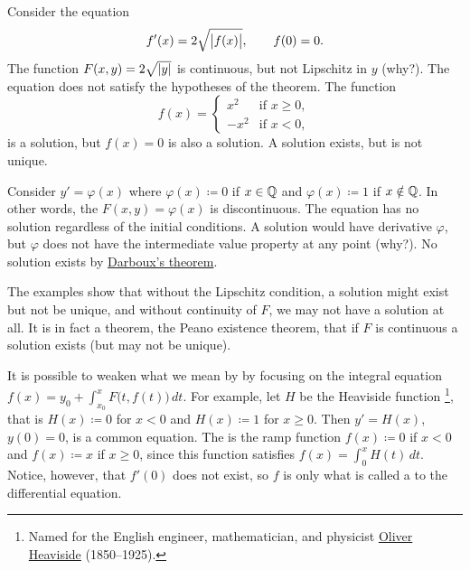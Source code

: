 \begin{example}
Consider the equation
\begin{equation*}
f'(x) = 2 \sqrt{\bigl\lvert {f(x)} \bigr\rvert}, \qquad f(0) = 0 .
\end{equation*}
The function $F(x,y) = 2 \sqrt{\lvert {y} \rvert}$ is continuous,
but not Lipschitz in $y$ (why?). 
The equation does not satisfy the hypotheses of the theorem.
The function
\begin{equation*}
f(x) =
\begin{cases}
x^2 & \text{if } x \geq 0,\\
-x^2 & \text{if } x < 0,
\end{cases}
\end{equation*}
is a solution, but $f(x) = 0$ is also a solution.
A solution exists, but is not unique.
\end{example}

\begin{example}
Consider $y' = \varphi(x)$ where $\varphi(x) \coloneqq 0$ if $x \in {\mathbb{Q}}$ and
$\varphi(x)\coloneqq 1$ if $x
\notin {\mathbb{Q}}$.  In other words, the $F(x,y) = \varphi(x)$ is discontinuous.
The equation has no solution regardless of the initial
conditions.
A solution would have
derivative $\varphi$, but $\varphi$ does not have the intermediate value property
at any point (why?).  No solution exists by
\hyperref[thm:darboux]{Darboux's theorem}.
\end{example}

The examples show that without the Lipschitz condition, a solution might
exist but not be unique, and without continuity of $F$, we may not
have a solution at all.
It is in fact a theorem, the Peano existence theorem, that if $F$ is
continuous a solution exists (but may not be unique).

\begin{remark}
It is possible to weaken what we mean by 
by focusing on the integral equation
$f(x) = y_0 + \int_{x_0}^x F\bigl(t,f(t)\bigr) \, dt$.  For example,
let $H$ be the
Heaviside function%
\footnote{Named
for the English engineer, mathematician, and physicist
\href{https://en.wikipedia.org/wiki/Oliver_Heaviside}{Oliver Heaviside}
(1850--1925).},
that is $H(x) \coloneqq 0$ for $x < 0$ and $H(x) \coloneqq 1$ for $x \geq 0$.
Then
$y' = H(x)$, $y(0) = 0$,
is a common equation.
The 
is the ramp function $f(x) \coloneqq 0$ if $x < 0$ and $f(x) \coloneqq x$ if $x \geq 0$,
since this function satisfies
$f(x) = \int_0^x H(t)\, dt$.  Notice, however, that $f'(0)$ does not exist,
so $f$ is only what is called a \emph{} to the
differential equation.
\end{remark}


